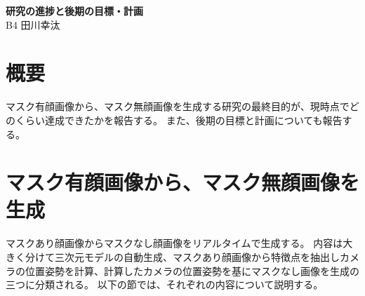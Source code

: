 \documentclass[]{jarticle}          %
\begin{document}

\vspace*{2ex}
\begin{center}
 {\Large \bf 研究の進捗と後期の目標・計画}\\ %
 \vspace*{5mm}
 {\large B4 田川幸汰}%
\end{center}






\section{概要}
マスク有顔画像から、マスク無顔画像を生成する研究の最終目的が、現時点でどのくらい達成できたかを報告する。
また、後期の目標と計画についても報告する。

\section{マスク有顔画像から、マスク無顔画像を生成}
マスクあり顔画像からマスクなし顔画像をリアルタイムで生成する。
内容は大きく分けて三次元モデルの自動生成、マスクあり顔画像から特徴点を抽出しカメラの位置姿勢を計算、計算したカメラの位置姿勢を基にマスクなし画像を生成の三つに分類される。
以下の節では、それぞれの内容について説明する。
\end{document}
